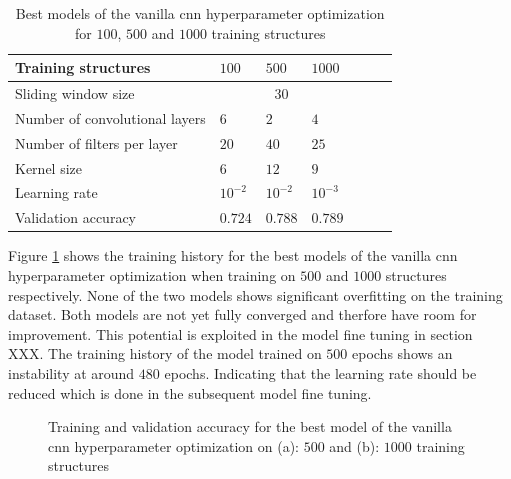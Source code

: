 \documentclass[conference]{IEEEtran}
\begin{document}
\begin{table}[htp]
	\centering
	\caption{Best models of the vanilla \gls{cnn} hyperparameter optimization for $ 100 $, $ 500 $ and $ 1000 $ training structures}
	\label{tab:hyperparameters_100_500_1000_structures_CNN}
	\begin{tabular}{p{2.5cm}|llllll}
		Training structures & $ 100 $ & $ 500 $ & $ 1000 $ \\
		\hline
		Sliding window size & \multicolumn{3}{c}{$ 30 $} \\
		\hline
		Number of convolutional layers & $ 6 $ & $ 2 $ & $ 4 $ \\
		Number of filters per layer & $ 20 $ & $ 40 $ & $ 25 $ \\
		Kernel size & $ 6 $ & $ 12 $ & $ 9 $ \\
		Learning rate & $ 10^{-2} $ & $ 10^{-2} $ & $ 10^{-3} $ \\
		\hline
		Validation accuracy & $ 0.724 $ & $ 0.788 $ & $ 0.789 $
	\end{tabular}
\end{table}

Figure \ref{fig:accuracy_500_1000_structures_random_search_CNN} shows the training history for the best models of the vanilla \gls{cnn} hyperparameter optimization when training on $ 500 $ and $ 1000 $ structures respectively. None of the two models shows significant overfitting on the training dataset. Both models are not yet fully converged and therfore have room for improvement. This potential is exploited in the model fine tuning in section XXX. The training history of the model trained on $ 500 $ epochs shows an instability at around $ 480 $ epochs. Indicating that the learning rate should be reduced which is done in the subsequent model fine tuning.

\begin{figure}[htp]
	\centering
	\quad
	\caption{Training and validation accuracy for the best model of the vanilla \gls{cnn} hyperparameter optimization on (a): $ 500 $ and (b): $ 1000 $ training structures}
	\label{fig:accuracy_500_1000_structures_random_search_CNN}
\end{figure}
\end{document}
